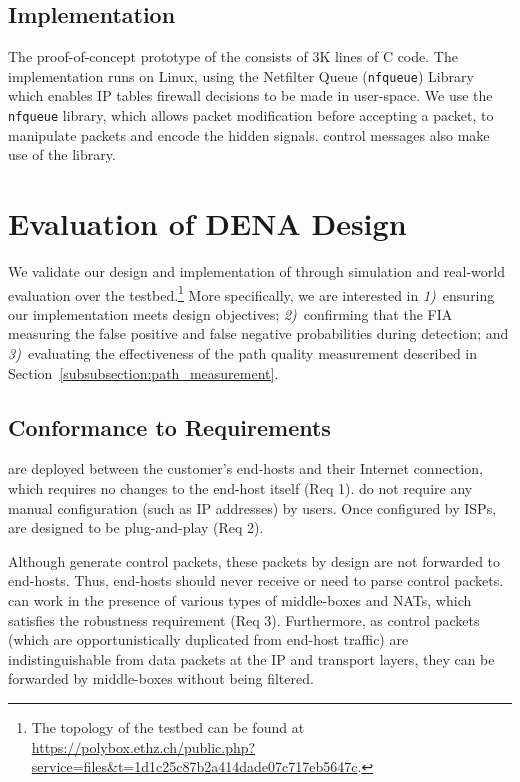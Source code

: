 \subsection{Implementation}
\label{sec:implementation}

The proof-of-concept prototype of the \name consists of 3K lines of C code. The
implementation runs on Linux, using the Netfilter Queue (\texttt{nfqueue})
Library~\cite{nfqueue} which enables IP tables firewall decisions to be made in
user-space. We use the \texttt{nfqueue} library, which allows packet
modification before accepting a packet, to manipulate packets and encode the
hidden signals. \name control messages also make use of the library. 

\section{Evaluation of DENA Design}
\label{sec:evaluation}
We validate our design and implementation of \name through simulation and
real-world evaluation over the \scion testbed.\footnote{The topology of the
testbed can be found at
\url{https://polybox.ethz.ch/public.php?service=files&t=1d1c25c87b2a414dade07c717eb5647c}.}
More specifically, we are interested in \textit{1)}~ensuring our implementation
meets design objectives; \textit{2)}~confirming that the FIA measuring the
false positive and false negative probabilities during \name detection; and
\textit{3)}~evaluating the effectiveness of the path quality measurement
described in Section~\ref{subsubsection:path_measurement}. 

\subsection{Conformance to Requirements}

\names are deployed between the customer's end-hosts and their Internet
connection, which requires no changes to the end-host itself (Req 1). \names do
not require any manual configuration (such as IP addresses) by users. Once
configured by ISPs, \names are designed to be plug-and-play (Req 2). 

Although \names generate control packets, these packets by design are not
forwarded to end-hosts. Thus, end-hosts should never receive or need to parse
control packets. \names can work in the presence of various types of
middle-boxes and NATs, which satisfies the robustness requirement (Req 3).
Furthermore, as control packets (which are opportunistically duplicated from
end-host traffic) are indistinguishable from data packets at the IP and
transport layers, they can be forwarded by middle-boxes without being filtered.


